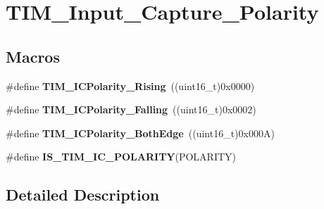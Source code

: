 \hypertarget{group___t_i_m___input___capture___polarity}{\section{T\-I\-M\-\_\-\-Input\-\_\-\-Capture\-\_\-\-Polarity}
\label{group___t_i_m___input___capture___polarity}
}
\subsection*{Macros}
\begin{DoxyCompactItemize}
\item 
\hypertarget{group___t_i_m___input___capture___polarity_gabe598596b7dbcac446a4918105fa95a6}{\#define {\bfseries T\-I\-M\-\_\-\-I\-C\-Polarity\-\_\-\-Rising}~((uint16\-\_\-t)0x0000)}\label{group___t_i_m___input___capture___polarity_gabe598596b7dbcac446a4918105fa95a6}

\item 
\hypertarget{group___t_i_m___input___capture___polarity_ga70c6f5ed30a236bac4c690928e742243}{\#define {\bfseries T\-I\-M\-\_\-\-I\-C\-Polarity\-\_\-\-Falling}~((uint16\-\_\-t)0x0002)}\label{group___t_i_m___input___capture___polarity_ga70c6f5ed30a236bac4c690928e742243}

\item 
\hypertarget{group___t_i_m___input___capture___polarity_ga4632a6425d407c0d28b610b2d31cccc8}{\#define {\bfseries T\-I\-M\-\_\-\-I\-C\-Polarity\-\_\-\-Both\-Edge}~((uint16\-\_\-t)0x000\-A)}\label{group___t_i_m___input___capture___polarity_ga4632a6425d407c0d28b610b2d31cccc8}

\item 
\#define {\bfseries I\-S\-\_\-\-T\-I\-M\-\_\-\-I\-C\-\_\-\-P\-O\-L\-A\-R\-I\-T\-Y}(P\-O\-L\-A\-R\-I\-T\-Y)
\end{DoxyCompactItemize}


\subsection{Detailed Description}


